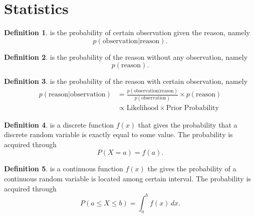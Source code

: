 \documentclass[a4paper]{article}
\theoremstyle{definition}
\newtheorem{definition}{Definition}
\theoremstyle{plain}
\begin{document}
\newpage
\section{Statistics}
\begin{definition}
 is the probability of certain observation given the reason, namely
\begin{equation*}
    p(\text{observation}|\text{reason}).
\end{equation*}
\end{definition}

\begin{definition}
 is the probability of the reason without any observation, namely
\begin{equation*}
    p(\text{reason}).
\end{equation*}
\end{definition}

\begin{definition}
 is the probability of the reason with certain observation, namely
\begin{align*}
    p(\text{reason}|\text{observation})&=\frac{p(\text{observation}|\text{reason})}{p(\text{observation})}\times p(\text{reason})\\
    &\propto \text{Likelihood}\times\text{Prior Probability}
\end{align*}
\end{definition}

\begin{definition}
 is a discrete function $f(x)$ that gives the probability that a discrete random variable is exactly equal to some value. The probability is acquired through
\begin{equation*}
    P(X=a)=f(a).
\end{equation*}
\end{definition}

\begin{definition}
 is a continuous function $f(x)$ the gives the probability of a continuous random variable is located among certain interval. The probability is acquired through
\begin{equation*}
    P(a\leq X\leq b)=\int _{a}^{b}f(x)\,dx.
\end{equation*}
\end{definition}
\end{document}
